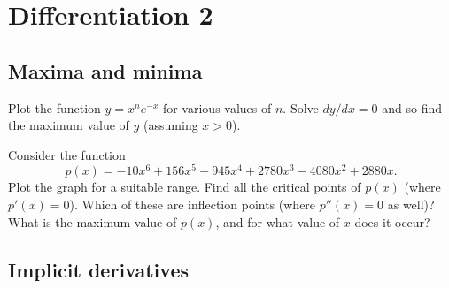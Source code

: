 \documentclass[a4paper,10pt]{amsbook}
\begin{document}
\chapter{Differentiation 2}

\section{Maxima and minima}

\begin{exercise}\label{ex-polyexp-max}
 Plot the function $y=x^ne^{-x}$ for various values of $n$.
 Solve $dy/dx=0$ and so find the maximum value of $y$
 (assuming $x>0$).
\end{exercise}

\begin{exercise}\label{ex-poly-max}
 Consider the function
 \[ p(x) = -10x^6+156x^5-945x^4+2780x^3-4080x^2+2880x. \]
 Plot the graph for a suitable range.  Find all the critical
 points of $p(x)$ (where $p'(x)=0$).  Which of these are
 inflection points (where $p''(x)=0$ as well)?  What is the
 maximum value of $p(x)$, and for what value of $x$ does it
 occur? 
\end{exercise}

\section{Implicit derivatives}
\end{document}
